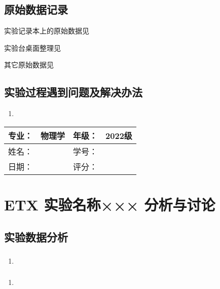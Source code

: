 \documentclass[dvipsnames, svgnames,a4paper,11pt]{article}
\begin{document}
	
	\clearpage
	\subsection{原始数据记录}
	实验记录本上的原始数据见%
	
	实验台桌面整理见%
	
	其它原始数据见%
	
	\subsection{实验过程遇到问题及解决办法}
	\begin{enumerate}
		\item 
	\end{enumerate}
	
	
	
	\clearpage
	
	\begin{table}
		\renewcommand\arraystretch{1.7}
		\begin{tabularx}{\textwidth}{|X|X|X|X|}
			\hline
			专业：& 物理学 &年级：& 2022级\\
			\hline
			姓名： &  & 学号：& \\
			\hline
			日期：&  & 评分： &\\
			\hline
		\end{tabularx}
	\end{table}
	
	\section{ETX 实验名称××× \quad\heiti 分析与讨论}
	
	\subsection{实验数据分析}
	
	\subsubsection{}
	\begin{enumerate}
		\item 
	\end{enumerate}
	
	\subsubsection{}
	\begin{enumerate}
		\item 
	\end{enumerate}
	
\end{document}
